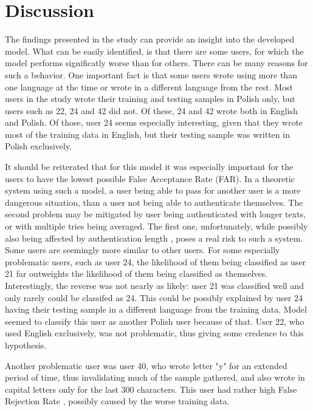 
\section{Discussion}
The findings presented in the study can provide an insight into the developed model. What can be easily identified, is that there are some users, for which the model performs significatly worse than for others. There can be many reasons for such a behavior. One important fact is that some users wrote using more than one language at the time or wrote in a different language from the rest. Most users in the study wrote their training and testing samples in Polish only, but users such as 22, 24 and 42 did not. Of these, 24 and 42 wrote both in English and Polish. Of those, user 24 seems especially interesting, given that they wrote most of the training data in English, but their testing sample was written in Polish exclusively.

It should be reiterated that for this model it was especially important for the users to have the lowest possible False Acceptance Rate (FAR). In a theoretic system using such a model, a user being able to pass for another user is a more dangerous situation, than a user not being able to authenticate themselves. The second problem may be mitigated by user being authenticated with longer texts, or with multiple tries being averaged. The first one, unfortunately, while possibly also being affected by authentication length , poses a real risk to such a system. Some users are seemingly more similar to other users. For some especially problematic users, such as user 24, the likelihood of them being classified as user 21 far outweights the likelihood of them being classified as themselves. Interestingly, the reverse was not nearly as likely: user 21 was classified well and only rarely could be classifed as 24. This could be possibly explained by user 24 having their testing sample in a different language from the training data. Model seemed to classify this user as another Polish user because of that. User 22, who used English exclusively, was not problematic, thus giving some credence to this hypothesis.

Another problematic user was user 40, who wrote letter "y" for an extended period of time, thus invalidating much of the sample gathered, and also wrote in capital letters only for the last 300 characters. This user had rather high False Rejection Rate , possibly caused by the worse training data.

